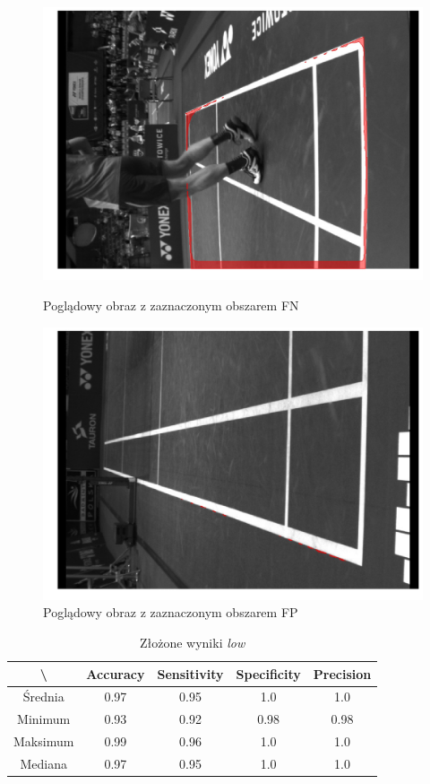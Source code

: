 \begin{figure}[!htb]
    \includegraphics[width=\linewidth]{56_fn_1564911595553287247.jpg}
    \caption{Poglądowy obraz z zaznaczonym obszarem FN}
  \endminipage\hfill
    \includegraphics[width=\linewidth]{56_fp_1564953159296706208_5.jpg}
    \caption{Poglądowy obraz z zaznaczonym obszarem FP}
  \endminipage\hfill
\end{figure}

\vspace{1cm}

\begin{table}[!h]
	\centering
	\caption{Złożone wyniki \textit{low}}
	\vspace{6pt}
	{\footnotesize
		\begin{tabular}{|c|c|c|c|c|}
			\hline \textbackslash & Accuracy & Sensitivity & Specificity & Precision \\
      \hline Średnia & 0.97 & 0.95 & 1.0 & 1.0 \\
      \hline Minimum & 0.93 & 0.92 & 0.98 & 0.98 \\
      \hline Maksimum & 0.99 & 0.96 & 1.0 & 1.0 \\
      \hline Mediana & 0.97 & 0.95 & 1.0 & 1.0 \\
      \hline
		\end{tabular}
	}
	\vspace{0pt}
\end{table}


